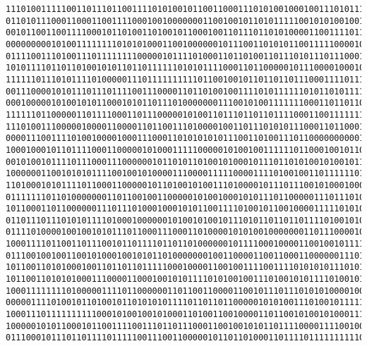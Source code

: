 \documentclass[oneside,10pt]{book}
\begin{document}
\begin{lstlisting}
1110100111110011011101100111101010010110011000111010100100010011101011101010010001100011\
0110101110001100011001111000100100000001100100101101011111001010100100110111111010111011\
0010110011001111000101101001101001011000100110111011010100001100111101111011000111001001\
0000000001010011111111010101000110010000001011100110101011001111100001010111010001111010\
0111100111010011101111111100000101111010001101101001101110101110111000100010111100000000\
1010111101101101001010110110111111010101111000110110000010111000010001011001000110101011\
1111110111010111101000001110111111111101100100101101101101110001111011101111000111111000\
0011100001010111011101111001110000110110100100111101011111101011010111101000100011000001\
0001000001010010101100010101101110100000001110010100111111100011011011010111100000010110\
1111110110000011011110001101110000010100110111011011011110001100111111110000101101100100\
1110100111000001000011000011011001110100001001101110101011100011011000101100101010010011\
0000111001111010010000100011100011010101010111001101001110110000000000111100101011110010\
1000100010110111100011000001010001111100000101001001111110110001001011010001110101101111\
0010100101111011100011100000010110101101001010001011101101010010100101100000100101001000\
1000000110010101011110010010100001110000111110000111101001001101111110100001111001110111\
1101000101011110110001100000101101001010011101000010111011100101000100010101100101000010\
0111111101101000000011011001001100000101001000101011101100000111011101000001101001101010\
1011000110110000001110111010001000101011001111010010110010000111110101010100010011111101\
0110111011101010111101000100000010100101001011101011011011011110100101010001000100111100\
0111101000010010010101110110001110001101000010101001000000011011100001011101001100110010\
1000111101100110111001011011110110110100000010111100010000110010010111110010101101100011\
0111001001001100101000100101011010000000100110000110011000110000001110101100100101000110\
1011001101010001001101101101111100010000110010011110011110101010111010100110001100100110\
1011001101010100011100001100010010101111010100100111010010101111010010110010111011101010\
1000111111110100000111101100000011011001100001100101110111010101000010011101111011100010\
0000011110100101101001011010101011110110110110000010101001110100101111100110111110000101\
1000111011111111110001010010010100011010011001000011011001010010100011100001110101011100\
1000001010110001011001111001110110111000110010010101101111000011110010000110001101000010\
0111000101110110111101111100111001100000101101101000110111101111111111000001011110001110\

\end{lstlisting}
\end{document}
